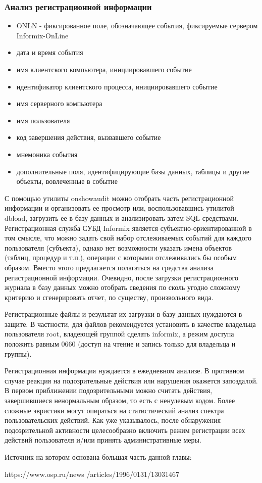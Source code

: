 \subsubsection{Анализ регистрационной информации}
\begin{itemize}
    \item ONLN - фиксированное поле, обозначающее события, фиксируемые сервером Informix-OnLine
    \item дата и время события
    \item имя клиентского компьютера, инициировавшего событие
    \item идентификатор клиентского процесса, инициировавшего событие
    \item имя серверного компьютера
    \item имя пользователя
    \item код завершения действия, вызвавшего событие
    \item мнемоника события
    \item дополнительные поля, идентифицирующие базы данных, таблицы и другие объекты, вовлеченные в событие
\end{itemize}

С помощью утилиты onshowaudit можно отобрать часть регистрационной информации и организовать ее просмотр или, воспользовавшись утилитой dbload, загрузить ее в базу данных и анализировать затем SQL-средствами. Регистрационная служба СУБД Informix является субъектно-ориентированной в том смысле, что можно задать свой набор отслеживаемых событий для каждого пользователя (субъекта), однако нет возможности указать имена объектов (таблиц, процедур и т.п.), операции с которыми отслеживались бы особым образом. Вместо этого предлагается полагаться на средства анализа регистрационной информации. Очевидно, после загрузки регистрационного журнала в базу данных можно отобрать сведения по сколь угодно сложному критерию и сгенерировать отчет, по существу, произвольного вида.

Регистрационные файлы и результат их загрузки в базу данных нуждаются в защите. В частности, для файлов рекомендуется установить в качестве владельца пользователя root, владеющей группой сделать informix, а режим доступа положить равным 0660 (доступ на чтение и запись только для владельца и группы).

Регистрационная информация нуждается в ежедневном анализе. В противном случае реакция на подозрительные действия или нарушения окажется запоздалой. В первом приближении подозрительными можно считать действия, завершившиеся ненормальным образом, то есть с ненулевым кодом. Более сложные эвристики могут опираться на статистический анализ спектра пользовательских действий. Как уже указывалось, после обнаружения подозрительной активности целесообразно включить режим регистрации всех действий пользователя и/или принять административные меры.

Источник на котором основана большая часть данной главы:

https://www.osp.ru/news
/articles/1996/0131/13031467
